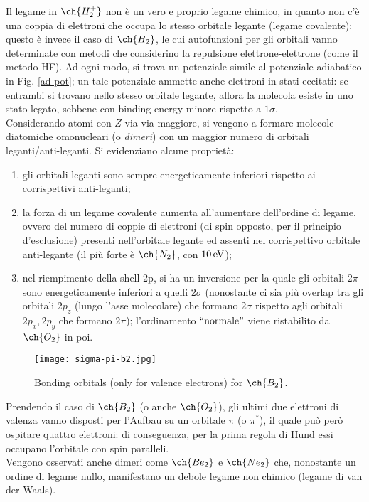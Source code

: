 Il legame in $ \ch{H_2^+} $ non è un vero e proprio legame chimico, in quanto non c'è una coppia di elettroni che occupa lo stesso orbitale legante (legame covalente): questo è invece il caso di $ \ch{H_2} $, le cui autofunzioni per gli orbitali vanno determinate con metodi che considerino la repulsione elettrone-elettrone (come il metodo HF). Ad ogni modo, si trova un potenziale simile al potenziale adiabatico in Fig. \ref{ad-pot}; un tale potenziale ammette anche elettroni in stati eccitati: se entrambi si trovano nello stesso orbitale legante, allora la molecola esiste in uno stato legato, sebbene con binding energy minore rispetto a $ 1\sigma $. \\
Considerando atomi con $ Z $ via via maggiore, si vengono a formare molecole diatomiche omonucleari (o \textit{dimeri}) con un maggior numero di orbitali leganti/anti-leganti. Si evidenziano alcune proprietà:
\begin{enumerate}
	\item gli orbitali leganti sono sempre energeticamente inferiori rispetto ai corrispettivi anti-leganti;
	\item la forza di un legame covalente aumenta all'aumentare dell'ordine di legame, ovvero del numero di coppie di elettroni (di spin opposto, per il principio d'esclusione\footnotemark) presenti nell'orbitale legante ed assenti nel corrispettivo orbitale anti-legante (il più forte è $ \ch{N_2} $, con $ 10\,\mathrm{eV} $);
	\item nel riempimento della shell $ \text{2p} $, si ha un inversione per la quale gli orbitali $ 2\pi $ sono energeticamente inferiori a quelli $ 2\sigma $ (nonostante ci sia più overlap tra gli orbitali $ 2p_z $ (lungo l'asse molecolare) che formano $ 2\sigma $ rispetto agli orbitali $ 2p_x , 2p_y $ che formano $ 2\pi $); l'ordinamento $ ``\text{normale}" $ viene ristabilito da $ \ch{O_2} $ in poi.
\end{enumerate}


\begin{figure}
	\centering
	\texttt{[image: sigma-pi-b2.jpg]}
	\caption{Bonding orbitals (only for valence electrons) for $ \ch{B_2} $.}
	\label{bond-b2}
\end{figure}

Prendendo il caso di $ \ch{B_2} $ (o anche $ \ch{O_2} $), gli ultimi due elettroni di valenza vanno disposti per l'Aufbau su un orbitale $ \pi $ (o $ \pi^* $), il quale può però ospitare quattro elettroni: di conseguenza, per la prima regola di Hund essi occupano l'orbitale con spin paralleli. \\
Vengono osservati anche dimeri come $ \ch{Be_2} $ e $ \ch{Ne_2} $ che, nonostante un ordine di legame nullo, manifestano un debole legame non chimico (legame di van der Waals).

